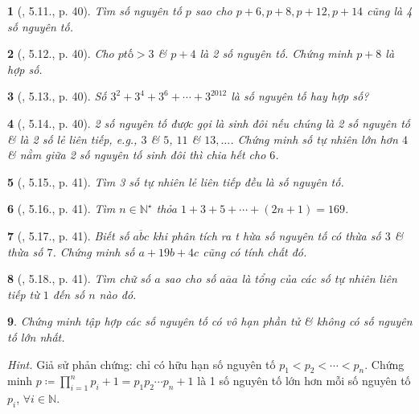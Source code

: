 \documentclass{article}
\newtheorem{baitoan}{}
\begin{document}
\begin{baitoan}[\cite{Binh_boi_duong_Toan_6_tap_1}, 5.11., p. 40]
	Tìm số nguyên tố $p$ sao cho $p + 6,p + 8,p + 12,p + 14$ cũng là 4 số nguyên tố.
\end{baitoan}

\begin{baitoan}[\cite{Binh_boi_duong_Toan_6_tap_1}, 5.12., p. 40]
	Cho $ptố > 3$ \& $p + 4$ là 2 số nguyên tố. Chứng minh $p + 8$ là hợp số.
\end{baitoan}

\begin{baitoan}[\cite{Binh_boi_duong_Toan_6_tap_1}, 5.13., p. 40]
	Số $3^2 + 3^4 + 3^6 + \cdots + 3^{2012}$ là số nguyên tố hay hợp số?
\end{baitoan}

\begin{baitoan}[\cite{Binh_boi_duong_Toan_6_tap_1}, 5.14., p. 40]
	2 số nguyên tố được gọi là {\rm sinh đôi} nếu chúng là 2 số nguyên tố \& là 2 số lẻ liên tiếp, e.g., $3$ \& $5$, $11$ \& $13,\ldots$. Chứng minh số tự nhiên lớn hơn $4$ \& nằm giữa 2 số nguyên tố sinh đôi thì chia hết cho $6$.
\end{baitoan}

\begin{baitoan}[\cite{Binh_boi_duong_Toan_6_tap_1}, 5.15., p. 41]
	Tìm 3 số tự nhiên lẻ liên tiếp đều là số nguyên tố.
\end{baitoan}

\begin{baitoan}[\cite{Binh_boi_duong_Toan_6_tap_1}, 5.16., p. 41]
	Tìm $n\in\mathbb{N}^\star$ thỏa $1 + 3 + 5 + \cdots + (2n + 1) = 169$.
\end{baitoan}

\begin{baitoan}[\cite{Binh_boi_duong_Toan_6_tap_1}, 5.17., p. 41]
	Biết số $\overline{abc}$ khi phân tích ra t hừa số nguyên tố có thừa số $3$ \& thừa số $7$. Chứng minh số $a + 19b + 4c$ cũng có tính chất đó.
\end{baitoan}

\begin{baitoan}[\cite{Binh_boi_duong_Toan_6_tap_1}, 5.18., p. 41]
	Tìm chữ số $a$ sao cho số $\overline{aaa}$ là tổng của các số tự nhiên liên tiếp từ $1$ đến số $n$ nào đó.
\end{baitoan}

\begin{baitoan}
	Chứng minh tập hợp các số nguyên tố có vô hạn phần tử \& không có số nguyên tố lớn nhất.
\end{baitoan}
\noindent\textit{Hint.} Giả sử phản chứng: chỉ có hữu hạn số nguyên tố $p_1 < p_2 < \cdots < p_n$. Chứng minh $p\coloneqq\prod_{i=1}^n p_i + 1 = p_1p_2\cdots p_n + 1$ là 1 số nguyên tố lớn hơn mỗi số nguyên tố $p_i$, $\forall i\in\mathbb{N}$.
\end{document}
